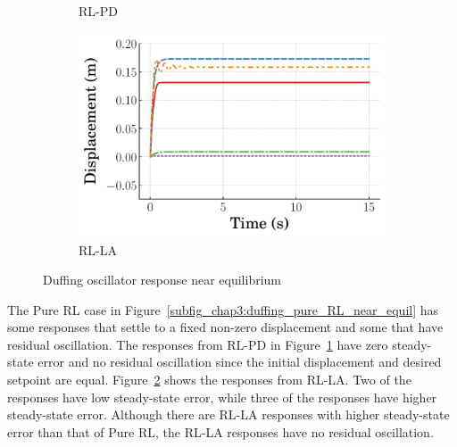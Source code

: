 \begin{figure}[tb]
\begin{subfigure}[b]{0.49\textwidth}
    \caption{RL-PD}
    \label{subfig_chap3:duffing_RL_PD_near_equil}
  \end{subfigure}
  \hfill
  \begin{subfigure}[b]{0.49\textwidth}
    \centering
    \includegraphics[width=\textwidth]{figures/figures_stability/time_responses_duffing/duffing_RL_LA/Displacement_0_init_10000_steps.pdf}
    \caption{RL-LA}
    \label{subfig_chap3:duffing_RL_LA_near_equil}
  \end{subfigure}
  \caption{Duffing oscillator response near equilibrium}
  \label{fig_chap3:duffing_near_equil}
\end{figure}
%
The Pure RL case in Figure~\ref{subfig_chap3:duffing_pure_RL_near_equil} has some responses that settle to a fixed non-zero displacement and some that have residual oscillation.
%
The responses from RL-PD in Figure~\ref{subfig_chap3:duffing_RL_PD_near_equil} have zero steady-state error and no residual oscillation
since the initial displacement and desired setpoint are equal. Figure~\ref{subfig_chap3:duffing_RL_LA_near_equil} shows the responses from RL-LA. Two of the responses have low steady-state error, while three of the responses have higher steady-state error. Although there are RL-LA responses with higher steady-state error than that of Pure RL, the RL-LA responses have no residual oscillation.
%
